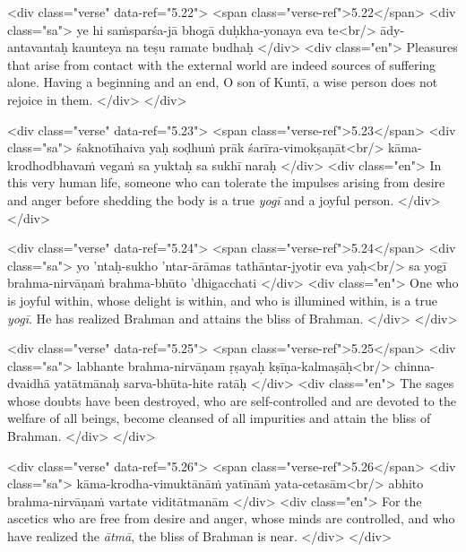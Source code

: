 \begin{html}
<div class="verse" data-ref="5.22">
  <span class="verse-ref">5.22</span>
  <div class="sa">
    ye hi saṁsparśa-jā bhogā duḥkha-yonaya eva te<br/>
    ādy-antavantaḥ kaunteya na teṣu ramate budhaḥ
  </div>
  <div class="en">
    Pleasures that arise from contact with the external world are indeed sources of suffering alone. Having a beginning and an end, O son of Kuntī, a wise person does not rejoice in them.
  </div>
</div>
\end{html}



\begin{html}
<div class="verse" data-ref="5.23">
  <span class="verse-ref">5.23</span>
  <div class="sa">
    śaknotīhaiva yaḥ soḍhuṁ prāk śarīra-vimokṣaṇāt<br/>
    kāma-krodhodbhavaṁ vegaṁ sa yuktaḥ sa sukhī naraḥ
  </div>
  <div class="en">
    In this very human life, someone who can tolerate the impulses arising from desire and anger before shedding the body is a true \textit{yogī} and a joyful person.
  </div>
</div>
\end{html}



\begin{html}
<div class="verse" data-ref="5.24">
  <span class="verse-ref">5.24</span>
  <div class="sa">
    yo ’ntaḥ-sukho ’ntar-ārāmas tathāntar-jyotir eva yaḥ<br/>
    sa yogī brahma-nirvāṇaṁ brahma-bhūto ’dhigacchati
  </div>
  <div class="en">
    One who is joyful within, whose delight is within, and who is illumined within, is a true \textit{yogī}. He has realized Brahman and attains the bliss of Brahman.
  </div>
</div>
\end{html}



\begin{html}
<div class="verse" data-ref="5.25">
  <span class="verse-ref">5.25</span>
  <div class="sa">
    labhante brahma-nirvāṇam ṛṣayaḥ kṣīṇa-kalmaṣāḥ<br/>
    chinna-dvaidhā yatātmānaḥ sarva-bhūta-hite ratāḥ
  </div>
  <div class="en">
    The sages whose doubts have been destroyed, who are self-controlled and are devoted to the welfare of all beings, become cleansed of all impurities and attain the bliss of Brahman.
  </div>
</div>
\end{html}



\begin{html}
<div class="verse" data-ref="5.26">
  <span class="verse-ref">5.26</span>
  <div class="sa">
    kāma-krodha-vimuktānāṁ yatīnāṁ yata-cetasām<br/>
    abhito brahma-nirvāṇaṁ vartate viditātmanām
  </div>
  <div class="en">
    For the ascetics who are free from desire and anger, whose minds are controlled, and who have realized the \textit{ātmā}, the bliss of Brahman is near.
  </div>
</div>
\end{html}


